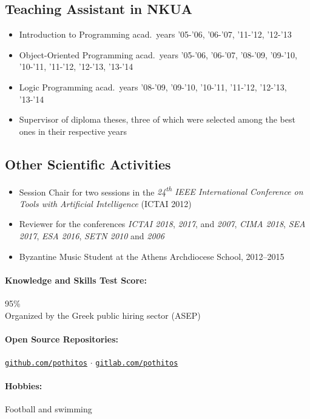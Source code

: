 \documentclass[a4paper]{article}
\begin{document}
\begin{cv}{}
\subsection*{Teaching Assistant in NKUA}
\begin{itemize}
  \item \textsf{Introduction to Programming} acad.\ years
        '05-'06, '06-'07, '11-'12, '12-'13
  \item \textsf{Object-Oriented Programming} acad.\ years
        '05-'06, '06-'07, '08-'09, '09-'10, '10-'11,
        '11-'12, '12-'13, '13-'14
  \item \textsf{Logic Programming} acad.\ years '08-'09,
        '09-'10, '10-'11, '11-'12, '12-'13, '13-'14
  \item \textsf{Supervisor} of diploma theses, three of
        which were selected among the best ones in their
        respective years
\end{itemize}

\subsection*{Other Scientific Activities}
\begin{itemize}
  \item \textsf{Session Chair} for two sessions in the
        \emph{24\textsuperscript{th} IEEE International
        Conference on Tools with Artificial Intelligence}
        (ICTAI 2012)
  \item \textsf{Reviewer} for the conferences \emph{ICTAI
        2018}, \emph{2017}, and \emph{2007}, \emph{CIMA
        2018}, \emph{SEA 2017}, \emph{ESA 2016}, \emph{SETN
        2010} and \emph{2006}
  \item \textsf{Byzantine Music Student} at the Athens
         Archdiocese School, 2012--2015
\end{itemize}

\paragraph{Knowledge and Skills Test Score:} 95\% \\
Organized by the Greek public hiring sector (ASEP)

\paragraph{Open Source Repositories:}
\href{https://github.com/pothitos}{\texttt{github.com/pothitos}}
$\cdot$
\href{https://gitlab.com/pothitos}{\texttt{gitlab.com/pothitos}}

\paragraph{Hobbies:} Football and swimming

\date{}

\end{cv}
\end{document}
